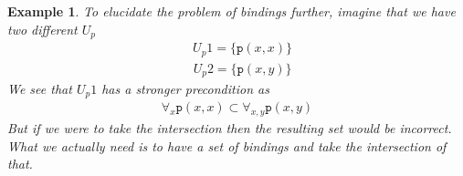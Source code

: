 \documentclass[../Master.tex]{subfiles}
\begin{document}
\newtheorem{thm-sokoban-2}{Example}[section]
\begin{thm-sokoban-2}\label{thm:sokoban-2}
To elucidate the problem of bindings further, imagine that we have two different $U_p$
\begin{align*}
&U_p1 = \{ \texttt{p}(x, x) \} 
\end{align*}
\begin{align*}
&U_p2 = \{ \texttt{p}(x, y) \} 
\end{align*}
We see that $U_p1$ has a stronger precondition as 
\begin{align*}
&\forall_{x} \texttt{p}(x, x) \subset \forall_{x, y} \texttt{p}(x, y)  & 
\end{align*}
But if we were to take the intersection then the resulting set would be incorrect. What we actually need is to have a set of bindings and take the intersection of that.
\end{thm-sokoban-2}
\end{document}
